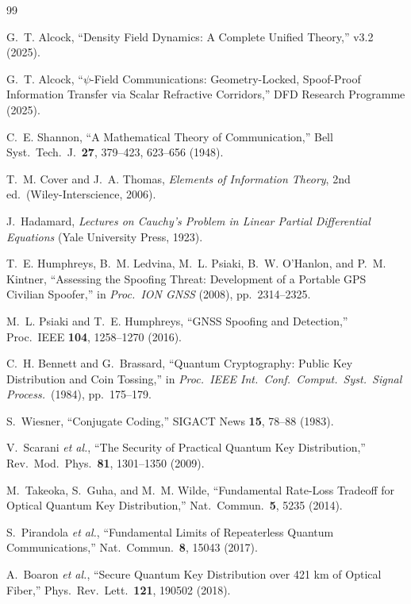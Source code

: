 \documentclass[twocolumn,superscriptaddress,prd,nofootinbib]{revtex4-2}
\begin{document}
\begin{thebibliography}{99}

G.~T. Alcock, ``Density Field Dynamics: A Complete Unified Theory,''
v3.2 (2025).

G.~T. Alcock, ``$\psi$-Field Communications: Geometry-Locked,
Spoof-Proof Information Transfer via Scalar Refractive Corridors,''
DFD Research Programme (2025).

C.~E. Shannon, ``A Mathematical Theory of Communication,''
Bell Syst.\ Tech.\ J.\ \textbf{27}, 379--423, 623--656 (1948).

T.~M. Cover and J.~A. Thomas, \textit{Elements of Information Theory},
2nd ed.\ (Wiley-Interscience, 2006).

J.~Hadamard, \textit{Lectures on Cauchy's Problem in Linear Partial
Differential Equations} (Yale University Press, 1923).

T.~E. Humphreys, B.~M. Ledvina, M.~L. Psiaki, B.~W. O'Hanlon, and
P.~M. Kintner, ``Assessing the Spoofing Threat: Development of a
Portable GPS Civilian Spoofer,'' in \textit{Proc.\ ION GNSS}
(2008), pp.\ 2314--2325.

M.~L. Psiaki and T.~E. Humphreys, ``GNSS Spoofing and Detection,''
Proc.\ IEEE \textbf{104}, 1258--1270 (2016).

C.~H. Bennett and G.~Brassard, ``Quantum Cryptography: Public Key
Distribution and Coin Tossing,'' in \textit{Proc.\ IEEE Int.\ Conf.\
Comput.\ Syst.\ Signal Process.}\ (1984), pp.\ 175--179.

S.~Wiesner, ``Conjugate Coding,'' SIGACT News \textbf{15}, 78--88 (1983).

V.~Scarani \textit{et al.}, ``The Security of Practical Quantum Key
Distribution,'' Rev.\ Mod.\ Phys.\ \textbf{81}, 1301--1350 (2009).

M.~Takeoka, S.~Guha, and M.~M. Wilde, ``Fundamental Rate-Loss
Tradeoff for Optical Quantum Key Distribution,''
Nat.\ Commun.\ \textbf{5}, 5235 (2014).

S.~Pirandola \textit{et al.}, ``Fundamental Limits of Repeaterless
Quantum Communications,'' Nat.\ Commun.\ \textbf{8}, 15043 (2017).

A.~Boaron \textit{et al.}, ``Secure Quantum Key Distribution over 421 km
of Optical Fiber,'' Phys.\ Rev.\ Lett.\ \textbf{121}, 190502 (2018).


\end{thebibliography}
\end{document}
